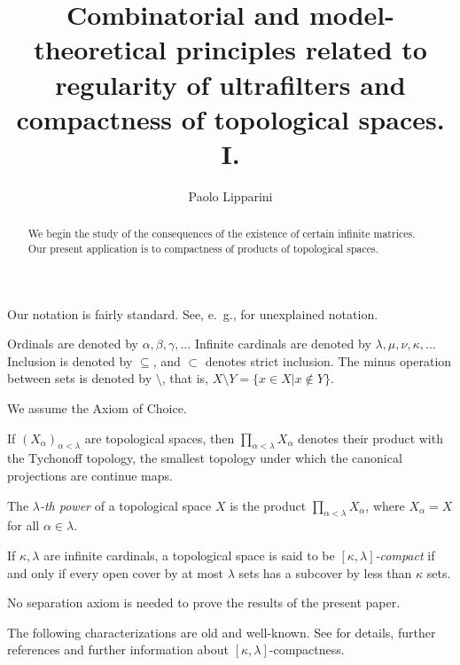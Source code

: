 \documentclass[12pt]{amsart}
\title[Combinatorial principles, compactness of spaces]
{Combinatorial and model-theoretical principles related to 
regularity of ultrafilters and compactness of topological spaces. I.}
\author[]{Paolo Lipparini}
\theoremstyle{definition}
\theoremstyle{remark}
\begin{document}
 

\begin{abstract} 
We begin the study of the consequences of the existence of certain
 infinite matrices. Our present application is to
 compactness of products of topological spaces.
\end{abstract} 


\maketitle 







Our notation is fairly standard. See, e.~g., \cite{CN,KV,EGT}
for unexplained notation.

Ordinals are denoted by $\alpha, \beta, \gamma,  \dots$
Infinite cardinals are denoted by $\lambda, \mu, \nu, \kappa, \dots$
Inclusion is denoted by $\subseteq$, and  
$\subset$ denotes
strict inclusion. The minus operation between sets is denoted by $\setminus$,
that is,
$X \setminus Y = \{x\in X| x \not \in Y\} $.

We assume the Axiom of Choice.

If
$ (X_ \alpha) _{\alpha < \lambda }  $
are topological spaces, then
$\prod_{\alpha <\lambda } X_ \alpha  $
denotes their product with the Tychonoff topology,
 the smallest
topology under which the canonical
projections are continue maps.

The {\em $ \lambda  $-th power} of a topological space $X$
is the product $\prod_{\alpha <\lambda } X_ \alpha  $,
where $X_ \alpha = X$ for all $ \alpha \in \lambda $.

If $ \kappa  , \lambda  $ are infinite cardinals, a topological space is
said to be  {\em $[ \kappa  , \lambda  ]$-compact}
if and only if
every open cover by at most $ \lambda $  sets  has a subcover by less than 
$\kappa $ sets.

No separation axiom is needed to prove the results of the present paper.

The following characterizations are old and well-known. See \cite[Section 3]{topappl} 
for details, further references and further information about 
$[ \kappa  , \lambda  ]$-compactness.
\end{document}
